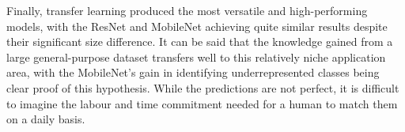 Finally, transfer learning produced the most versatile and high-performing models, with the ResNet and MobileNet achieving
quite similar results despite their significant size difference.
It can be said that the knowledge gained from a large general-purpose dataset transfers well to this relatively niche
application area, with the MobileNet's gain in identifying underrepresented classes being clear proof of this hypothesis.
While the predictions are not perfect, it is difficult to imagine the labour and time commitment needed for a human to match
them on a daily basis.





